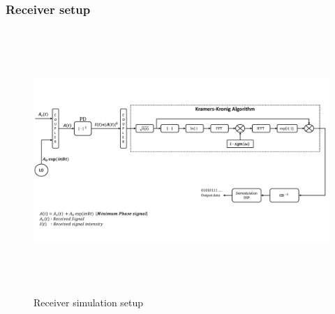 \subsubsection{Receiver setup}
\begin{figure}[h]
	\centering
	\includegraphics[width=1.0\textwidth, height=10cm]{./sdf/simplified_coherent_receiver/figures/Simulation_setup_Rx.pdf}
	\caption{Receiver simulation setup}\label{Simulation_setup_Rx}
\end{figure}
\newpage
